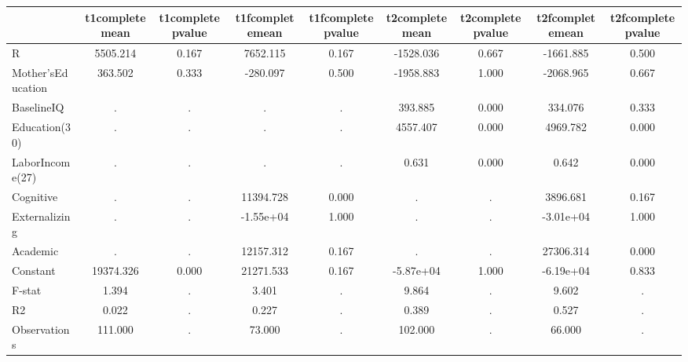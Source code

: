 \begin{table}[htbp]
\begin{tabular}{lcccccccc} \hline \hline
 & t1completemean  & t1completepvalue  & t1fcompletemean  & t1fcompletepvalue  & t2completemean  & t2completepvalue  & t2fcompletemean  & t2fcompletepvalue  \\  \hline 
R &  5505.214 &     0.167 &  7652.115 &     0.167 & -1528.036 &     0.667 & -1661.885 &     0.500 \\  
Mother'sEducation &   363.502 &     0.333 &  -280.097 &     0.500 & -1958.883 &     1.000 & -2068.965 &     0.667 \\  
BaselineIQ &         . &         . &         . &         . &   393.885 &     0.000 &   334.076 &     0.333 \\  
Education(30) &         . &         . &         . &         . &  4557.407 &     0.000 &  4969.782 &     0.000 \\  
LaborIncome(27) &         . &         . &         . &         . &     0.631 &     0.000 &     0.642 &     0.000 \\  
Cognitive &         . &         . & 11394.728 &     0.000 &         . &         . &  3896.681 &     0.167 \\  
Externalizing &         . &         . & -1.55e+04 &     1.000 &         . &         . & -3.01e+04 &     1.000 \\  
Academic &         . &         . & 12157.312 &     0.167 &         . &         . & 27306.314 &     0.000 \\  
Constant & 19374.326 &     0.000 & 21271.533 &     0.167 & -5.87e+04 &     1.000 & -6.19e+04 &     0.833 \\  
F-stat &     1.394 &         . &     3.401 &         . &     9.864 &         . &     9.602 &         . \\  
R2 &     0.022 &         . &     0.227 &         . &     0.389 &         . &     0.527 &         . \\  
Observations &   111.000 &         . &    73.000 &         . &   102.000 &         . &    66.000 &         . \\  
\hline \hline \end{tabular}
\end{table}
